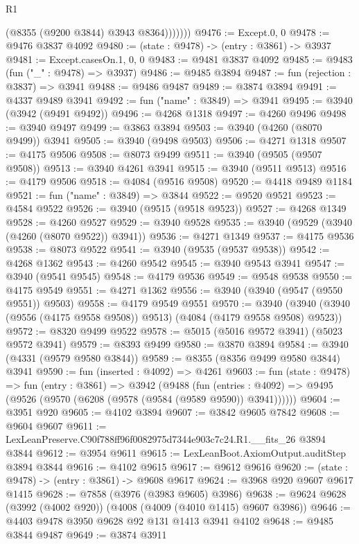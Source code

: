 \begin{lexlean}{R1}
\begin{coremodule}
                (@8355 (@9200 @3844) @3943 @8364)))))))
@9476 := Except.{0, 0}
@9478 := @9476 @3837 @4092
@9480 := (state : @9478) -> (entry : @3861) -> @3937
@9481 := Except.casesOn.{1, 0, 0}
@9483 := @9481 @3837 @4092
@9485 := @9483 (fun ("_" : @9478) => @3937)
@9486 := @9485 @3894
@9487 := fun (rejection : @3837) => @3941
@9488 := @9486 @9487
@9489 := @3874 @3894
@9491 := @4337 @9489 @3941
@9492 := fun ("name" : @3849) => @3941
@9495 := @3940 (@3942 (@9491 @9492))
@9496 := @4268 @1318
@9497 := @4260 @9496
@9498 := @3940 @9497
@9499 := @3863 @3894
@9503 := @3940 (@4260 (@8070 @9499)) @3941
@9505 := @3940 (@9498 @9503)
@9506 := @4271 @1318
@9507 := @4175 @9506
@9508 := @8073 @9499
@9511 := @3940 (@9505 (@9507 @9508))
@9513 := @3940 @4261 @3941
@9515 := @3940 (@9511 @9513)
@9516 := @4179 @9506
@9518 := @4084 (@9516 @9508)
@9520 := @4418 @9489 @1184
@9521 := fun ("name" : @3849) => @3844
@9522 := @9520 @9521
@9523 := @4584 @9522
@9526 := @3940 (@9515 (@9518 @9523))
@9527 := @4268 @1349
@9528 := @4260 @9527
@9529 := @3940 @9528
@9535 := @3940 (@9529 (@3940 (@4260 (@8070 @9522)) @3941))
@9536 := @4271 @1349
@9537 := @4175 @9536
@9538 := @8073 @9522
@9541 := @3940 (@9535 (@9537 @9538))
@9542 := @4268 @1362
@9543 := @4260 @9542
@9545 := @3940 @9543 @3941
@9547 := @3940 (@9541 @9545)
@9548 := @4179 @9536
@9549 := @9548 @9538
@9550 := @4175 @9549
@9551 := @4271 @1362
@9556 := @3940 (@3940 (@9547 (@9550 @9551)) @9503)
@9558 := @4179 @9549 @9551
@9570 := @3940 (@3940 (@3940 (@9556 (@4175 @9558 @9508)) @9513) (@4084 (@4179 @9558 @9508) @9523))
@9572 := @8320 @9499 @9522
@9578 := @5015 (@5016 @9572 @3941) (@5023 @9572 @3941)
@9579 := @8393 @9499
@9580 := @3870 @3894
@9584 := @3940 (@4331 (@9579 @9580 @3844))
@9589 := @8355 (@8356 @9499 @9580 @3844) @3941
@9590 := fun (inserted : @4092) => @4261
@9603 := fun (state : @9478) =>
  fun (entry : @3861) =>
  @3942
    (@9488
      (fun (entries : @4092) => @9495 (@9526 (@9570 (@6208 (@9578 (@9584 (@9589 @9590)) @3941))))))
@9604 := @3951 @920
@9605 := @4102 @3894
@9607 := @3842 @9605 @7842
@9608 := @9604 @9607
@9611 := LexLeanPreserve.C90f788ff96f0082975d7344e903c7c24.R1.__fits_26 @3894 @3844
@9612 := @3954 @9611
@9615 := LexLeanBoot.AxiomOutput.auditStep @3894 @3844
@9616 := @4102 @9615
@9617 := @9612 @9616
@9620 := (state : @9478) -> (entry : @3861) -> @9608 @9617
@9624 := @3968 @920 @9607 @9617 @1415
@9628 := @7858 (@3976 (@3983 @9605) @3986)
@9638 := @9624 @9628 (@3992 (@4002 @920)) (@4008 (@4009 (@4010 @1415) @9607 @3986))
@9646 := @4403 @9478 @3950 @9628 @92 @131 @1413 @3941 @4102
@9648 := @9485 @3844 @9487
@9649 := @3874 @3911

\end{coremodule}
\end{lexlean}
